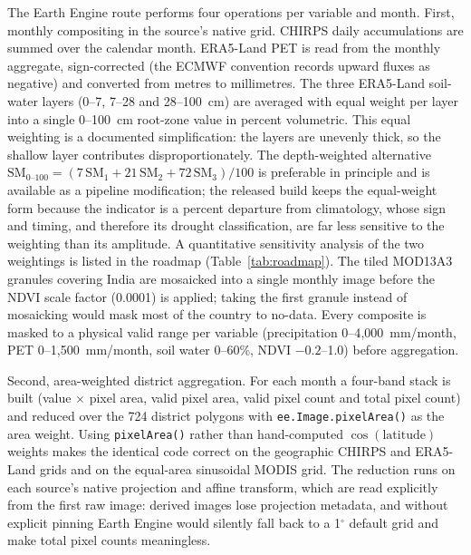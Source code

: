 \documentclass[10pt,a4paper]{article}
\begin{document}
The Earth Engine route performs four operations per variable and month. First, monthly compositing in the source's native grid. CHIRPS daily accumulations are summed over the calendar month. ERA5-Land PET is read from the monthly aggregate, sign-corrected (the ECMWF convention records upward fluxes as negative) and converted from metres to millimetres. The three ERA5-Land soil-water layers (0--7, 7--28 and 28--100~cm) are averaged with equal weight per layer into a single 0--100~cm root-zone value in percent volumetric. This equal weighting is a documented simplification: the layers are unevenly thick, so the shallow layer contributes disproportionately. The depth-weighted alternative $\mathrm{SM}_{0\text{--}100}=(7\,\mathrm{SM}_1+21\,\mathrm{SM}_2+72\,\mathrm{SM}_3)/100$ is preferable in principle and is available as a pipeline modification; the released build keeps the equal-weight form because the indicator is a percent departure from climatology, whose sign and timing, and therefore its drought classification, are far less sensitive to the weighting than its amplitude. A quantitative sensitivity analysis of the two weightings is listed in the roadmap (Table~\ref{tab:roadmap}). The tiled MOD13A3 granules covering India are mosaicked into a single monthly image before the NDVI scale factor (0.0001) is applied; taking the first granule instead of mosaicking would mask most of the country to no-data. Every composite is masked to a physical valid range per variable (precipitation 0--4{,}000~mm/month, PET 0--1{,}500~mm/month, soil water 0--60\%, NDVI $-0.2$--1.0) before aggregation.

Second, area-weighted district aggregation. For each month a four-band stack is built (value $\times$ pixel area, valid pixel area, valid pixel count and total pixel count) and reduced over the 724 district polygons with \texttt{ee.Image.pixelArea()} as the area weight. Using \texttt{pixelArea()} rather than hand-computed $\cos(\mathrm{latitude})$ weights makes the identical code correct on the geographic CHIRPS and ERA5-Land grids and on the equal-area sinusoidal MODIS grid. The reduction runs on each source's native projection and affine transform, which are read explicitly from the first raw image: derived images lose projection metadata, and without explicit pinning Earth Engine would silently fall back to a 1$^\circ$ default grid and make total pixel counts meaningless.
\end{document}
